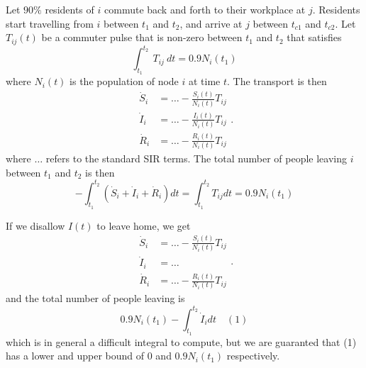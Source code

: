 \documentclass{article}
\begin{document}
Let $90\%$ residents of $i$ commute back and forth to their workplace at $j$. Residents start travelling from $i$ between $t_1$ and $t_2$, and arrive at $j$ between $t_{c1}$ and $t_{c2}$. Let $T_{ij}(t)$ be a commuter pulse that is non-zero between $t_1$ and $t_2$ that satisfies
\[
\int_{t_1}^{t_2}\ T_{ij}\ dt = 0.9 N_i(t_1)
\]
where $N_i(t)$ is the population of node $i$ at time $t$. The transport is then
\[
\begin{aligned}
\dot{S}_i & = \dots - \frac{S_i(t)}{N_i(t)} T_{ij} \\
\dot{I}_i & = \dots - \frac{I_i(t)}{N_i(t)} T_{ij} \\
\dot{R}_i & = \dots - \frac{R_i(t)}{N_i(t)} T_{ij}
\end{aligned}.
\]
where $\dots$ refers to the standard SIR terms. The total number of people leaving $i$ between $t_1$ and $t_2$ is then
\[
- \int_{t_1}^{t_2} \left(\dot{S}_i + \dot{I}_i + \dot{R}_i\right) dt = \int_{t_1}^{t_2} T_{ij} dt = 0.9 N_i(t_1)
\]

If we disallow $I(t)$ to leave home, we get
\[
\begin{aligned}
\dot{S}_i & = \dots - \frac{S_i(t)}{N_i(t)} T_{ij} \\
\dot{I}_i & = \dots \\
\dot{R}_i & = \dots - \frac{R_i(t)}{N_i(t)} T_{ij}
\end{aligned}.
\]
and the total number of people leaving is
\[
0.9 N_i(t_1) - \int_{t_1}^{t_2} \dot{I}_i dt \quad (1)
\]
which is in general a difficult integral to compute, but we are guaranted that (1) has a lower and upper bound of $0$ and $0.9 N_i(t_1)$ respectively.
\end{document}
